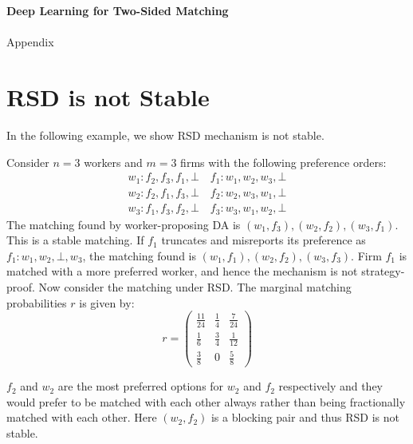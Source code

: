 \appendix
\begin{center}
{
\Large
\textbf{
Deep Learning for Two-Sided Matching}
~\\
~\\	
Appendix
}
\end{center}


\section{RSD is not Stable}\label{app:rsd-unstable}
In the following example, we show RSD mechanism is not stable.

\begin{example}
\label{ex:1}
Consider $n = 3$ workers and $m = 3$ firms with the following preference orders:
\begin{align*}
    w_1: f_2, f_3, f_1, \bot \quad f_1: w_1, w_2, w_3, \bot\\
    w_2: f_2, f_1, f_3, \bot \quad f_2: w_2, w_3, w_1, \bot\\
    w_3: f_1, f_3, f_2, \bot \quad f_3: w_3, w_1, w_2, \bot
\end{align*}
The  matching found by worker-proposing DA is $(w_1, f_3), (w_2, f_2), (w_3, f_1)$. This is a stable matching. If $f_1$ truncates and misreports its preference as $f_1: w_1, w_2, \bot, w_3$, the matching found is $(w_1, f_1), (w_2, f_2), (w_3, f_3)$. Firm $f_1$ is matched with a more preferred worker, and hence the mechanism is not strategy-proof.
%
Now consider the matching under RSD. The marginal matching probabilities $r$ is given by: 
\begin{equation*}
r = 
\left(\begin{matrix}
\frac{11}{24} & \frac{1}{4} & \frac{7}{24}\\[4pt]
\frac{1}{6} & \frac{3}{4} & \frac{1}{12}\\[4pt]
\frac{3}{8} & 0 & \frac{5}{8} 
\end{matrix}\right)
\end{equation*}

$f_2$ and $w_2$ are the most preferred options for $w_2$ and $f_2$ respectively and they would prefer to be matched with each other always rather than being fractionally matched with each other. Here $(w_2, f_2)$ is a blocking pair and thus RSD is not stable.
\end{example}



